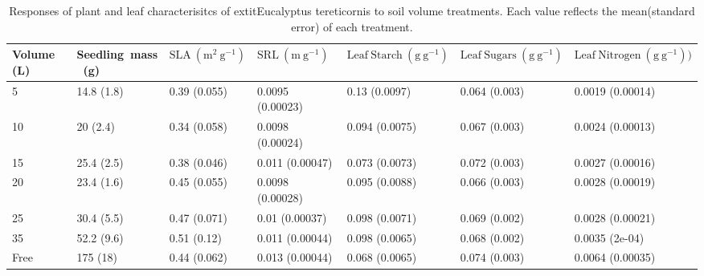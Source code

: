 \documentclass[a4paper]{article}\usepackage[]{graphicx}\usepackage[]{color}
\begin{document}
\begin{table}
\centering
\caption{Responses of plant and leaf characterisitcs of 	extit{Eucalyptus tereticornis} to soil volume treatments. Each value reflects the mean(standard error) of each treatment.} 
\label{table:Table1}
\begin{tabular}{lllllll}
  \hline
	{Volume~(L)} & 	{Seedling~mass~(g)} & $\mathrm{SLA~(m^2~g^{-1})}$ & $\mathrm{SRL~(m~g^{-1})}$ & $\mathrm{Leaf~Starch~(g~g^{-1})}$ & $\mathrm{Leaf~Sugars~(g~g^{-1})}$ & $\mathrm{Leaf~Nitrogen~(g~g^{-1}))}$ \\ 
  \hline
5 & 14.8 (1.8) & 0.39 (0.055) & 0.0095 (0.00023) & 0.13 (0.0097) & 0.064 (0.003) & 0.0019 (0.00014) \\ 
  10 & 20 (2.4) & 0.34 (0.058) & 0.0098 (0.00024) & 0.094 (0.0075) & 0.067 (0.003) & 0.0024 (0.00013) \\ 
  15 & 25.4 (2.5) & 0.38 (0.046) & 0.011 (0.00047) & 0.073 (0.0073) & 0.072 (0.003) & 0.0027 (0.00016) \\ 
  20 & 23.4 (1.6) & 0.45 (0.055) & 0.0098 (0.00028) & 0.095 (0.0088) & 0.066 (0.003) & 0.0028 (0.00019) \\ 
  25 & 30.4 (5.5) & 0.47 (0.071) & 0.01 (0.00037) & 0.098 (0.0071) & 0.069 (0.002) & 0.0028 (0.00021) \\ 
  35 & 52.2 (9.6) & 0.51 (0.12) & 0.011 (0.00044) & 0.098 (0.0065) & 0.068 (0.002) & 0.0035 (2e-04) \\ 
  Free & 175 (18) & 0.44 (0.062) & 0.013 (0.00044) & 0.068 (0.0065) & 0.074 (0.003) & 0.0064 (0.00035) \\ 
   \hline
\end{tabular}
\end{table}
\end{document}
